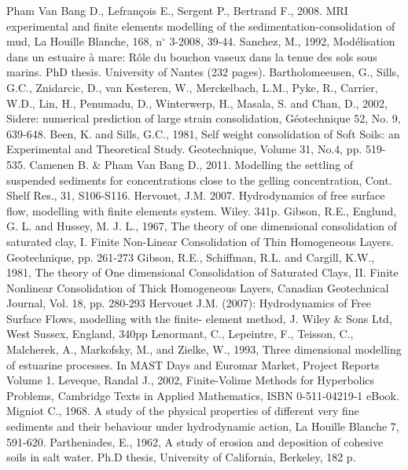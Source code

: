 Pham Van Bang D., Lefran\c{c}ois E., Sergent P., Bertrand F., 2008. MRI
experimental and finite elements modelling of the
sedimentation-consolidation of mud, La Houille Blanche, 168, n$^\circ$%
3-2008, 39-44.\newline
Sanchez, M., 1992, Mod\'{e}lisation dans un estuaire \`{a} mare: R\^{o}le du
bouchon vaseux dans la tenue des sols sous marins. PhD thesis. University of
Nantes (232 pages).\newline
Bartholomeeusen, G., Sills, G.C., Znidarcic, D., van Kesteren, W.,
Merckelbach, L.M., Pyke, R., Carrier, W.D., Lin, H., Penumadu, D.,
Winterwerp, H., Masala, S. and Chan, D., 2002, Sidere: numerical prediction
of large strain consolidation, G\'{e}otechnique 52, No. 9, 639-648.\newline
Been, K. and Sills, G.C., 1981, Self weight consolidation of Soft Soils: an
Experimental and Theoretical Study. Geotechnique, Volume 31, No.4, pp.
519-535.\newline
Camenen B. \& Pham Van Bang D., 2011. Modelling the settling of suspended
sediments for concentrations close to the gelling concentration, Cont. Shelf
Res., 31, S106-S116.\newline
Hervouet, J.M. 2007. Hydrodynamics of free surface flow, modelling with
finite elements system. Wiley. 341p.\newline
Gibson, R.E., Englund, G. L. and Hussey, M. J. L., 1967, The theory of one
dimensional consolidation of saturated clay, I. Finite Non-Linear
Consolidation of Thin Homogeneous Layers. Geotechnique, pp. 261-273\newline
Gibson, R.E., Schiffman, R.L. and Cargill, K.W., 1981, The theory of One
dimensional Consolidation of Saturated Clays, II. Finite Nonlinear
Consolidation of Thick Homogeneous Layers, Canadian Geotechnical Journal,
Vol. 18, pp. 280-293\newline
Hervouet J.M. (2007): Hydrodynamics of Free Surface Flows, modelling with
the finite- element method, J. Wiley \& Sons Ltd, West Sussex, England, 340pp%
\newline
Lenormant, C., Lepeintre, F., Teisson, C., Malcherek, A., Markofsky, M., and
Zielke, W., 1993, Three dimensional modelling of estuarine processes. In
MAST Days and Euromar Market, Project Reports Volume 1.\newline
Leveque, Randal J., 2002, Finite-Volime Methods for Hyperbolics Problems,
Cambridge Texts in Applied Mathematics, ISBN 0-511-04219-1 eBook.\newline
Migniot C., 1968. A study of the physical properties of different very fine
sediments and their behaviour under hydrodynamic action, La Houille Blanche
7, 591-620.\newline
Partheniades, E., 1962, A study of erosion and deposition of cohesive soils
in salt water. Ph.D thesis, University of California, Berkeley, 182 p.

